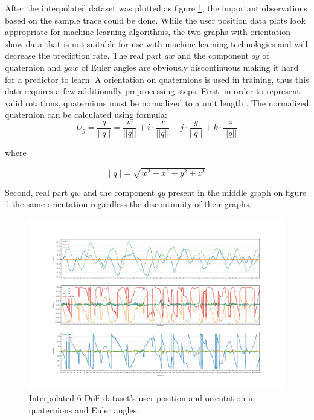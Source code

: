 After the interpolated dataset was plotted as figure \ref{fig:inter_data}, the important observations based on the sample trace could be done. While the user position data plots look appropriate for machine learning algorithms, the two graphs with orientation show data that is not suitable for use with machine learning technologies and will decrease the prediction rate. The real part $qw$ and the component $qy$ of quaternion and $yaw$ of Euler angles are obviously discontinuous making it hard for a predictor to learn. A orientation on quaternions is used in training, thus this data requires a few additionally preprocessing steps. First, in order to represent valid rotations, quaternions must be normalized to a unit length \cite{principles_robot_motion_book}. The normalized quaternion can be calculated using formula:
\begin{equation}
U_g = \frac{q}{|| q ||} = \frac{w}{|| q ||} + i \cdot \frac{x}{|| q ||} + j \cdot \frac{y}{|| q ||} + k \cdot \frac{z}{|| q ||}
\end{equation}

where

\begin{equation}
|| q || = \sqrt{w^2 + x^2 + y^2 + z^2 }
\end{equation}

Second, real part $qw$ and the component $qy$ present in the middle graph on figure \ref{fig:inter_data} the same orientation regardless the discontinuity of their graphs. 

\begin{figure}[htb]
	\begin{center}
		\includegraphics[width=1\textwidth, keepaspectratio]{gfx/Fig-1556-interpolated.pdf}
		\caption{\label{fig:inter_data}Interpolated 6-DoF dataset's user position and orientation in quaternions and Euler angles.}
	\end{center}
\end{figure}

